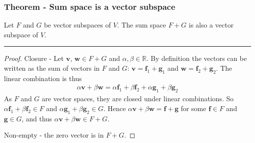\documentclass[usenames,dvipsnames,aspectratio=169,10pt]{beamer}
\numberwithin{equation}{section}
\begin{document}
\begin{frame}
\frametitle{Theorem - Sum space is a vector subspace}
Let $F$ and $G$ be vector subspaces of $V$. The sum space $F+G$ is also a vector subspace of $V$.
\vspace{-0.3cm}\begin{center} \textcolor{airforceblue}{\rule{0.7\textwidth}{0.3mm}} \end{center}\vspace{-0.2cm}

\begin{proof}
Closure - Let $\textbf{v}$, $\textbf{w} \in F+G$ and $\alpha,\beta \in \mathbb{R}$. By definition the vectors can be written as the sum of vectors in $F$ and $G$: $\textbf{v}=\textbf{f}_1+\textbf{g}_1$ and $\textbf{w}=\textbf{f}_2+\textbf{g}_2$. The linear combination is thus
\begin{align*}
\alpha \textbf{v} + \beta \textbf{w} = \alpha\textbf{f}_1+\beta\textbf{f}_2+\alpha\textbf{g}_1+\beta\textbf{g}_2
\end{align*}
As $F$ and $G$ are vector spaces, they are closed under linear combinations. So $\alpha\textbf{f}_1+\beta\textbf{f}_2\in F$ and $\alpha\textbf{g}_1+\beta\textbf{g}_2 \in G$. Hence $\alpha \textbf{v} + \beta \textbf{w} = \textbf{f} + \textbf{g}$ for some $\textbf{f}\in F$ and $\textbf{g}\in G$, and thus $\alpha \textbf{v} + \beta \textbf{w} \in F+G$.

Non-empty - the zero vector is in $F+G$.
\end{proof}
\end{frame}
\end{document}

